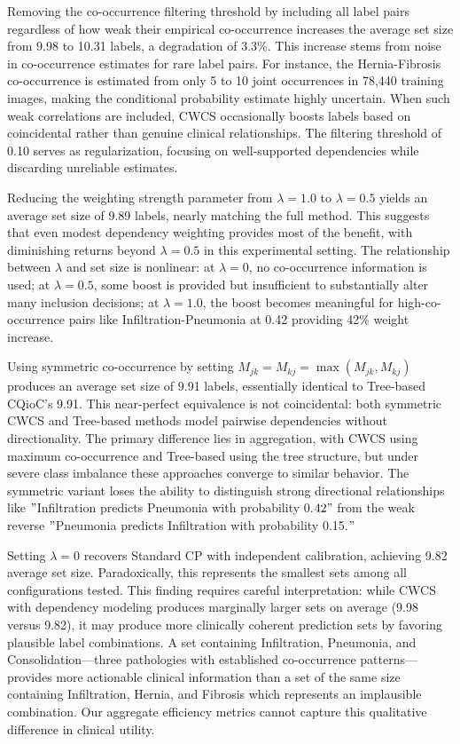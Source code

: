 Removing the co-occurrence filtering threshold by including all label pairs regardless of how weak their empirical co-occurrence increases the average set size from 9.98 to 10.31 labels, a degradation of 3.3\%.
This increase stems from noise in co-occurrence estimates for rare label pairs.
For instance, the Hernia-Fibrosis co-occurrence is estimated from only 5 to 10 joint occurrences in 78,440 training images, making the conditional probability estimate highly uncertain.
When such weak correlations are included, CWCS occasionally boosts labels based on coincidental rather than genuine clinical relationships.
The filtering threshold of 0.10 serves as regularization, focusing on well-supported dependencies while discarding unreliable estimates.

Reducing the weighting strength parameter from $\lambda=1.0$ to $\lambda=0.5$ yields an average set size of 9.89 labels, nearly matching the full method.
This suggests that even modest dependency weighting provides most of the benefit, with diminishing returns beyond $\lambda=0.5$ in this experimental setting.
The relationship between $\lambda$ and set size is nonlinear: at $\lambda=0$, no co-occurrence information is used; at $\lambda=0.5$, some boost is provided but insufficient to substantially alter many inclusion decisions; at $\lambda=1.0$, the boost becomes meaningful for high-co-occurrence pairs like Infiltration-Pneumonia at 0.42 providing 42\% weight increase.

Using symmetric co-occurrence by setting $M_{jk} = M_{kj} = \max(M_{jk}, M_{kj})$ produces an average set size of 9.91 labels, essentially identical to Tree-based CQioC's 9.91.
This near-perfect equivalence is not coincidental: both symmetric CWCS and Tree-based methods model pairwise dependencies without directionality.
The primary difference lies in aggregation, with CWCS using maximum co-occurrence and Tree-based using the tree structure, but under severe class imbalance these approaches converge to similar behavior.
The symmetric variant loses the ability to distinguish strong directional relationships like \("\)Infiltration predicts Pneumonia with probability 0.\(42"\) from the weak reverse \("\)Pneumonia predicts Infiltration with probability 0.15.\("\)

Setting $\lambda=0$ recovers Standard CP with independent calibration, achieving 9.82 average set size.
Paradoxically, this represents the smallest sets among all configurations tested.
This finding requires careful interpretation: while CWCS with dependency modeling produces marginally larger sets on average (9.98 versus 9.82), it may produce more clinically coherent prediction sets by favoring plausible label combinations.
A set containing Infiltration, Pneumonia, and Consolidation—three pathologies with established co-occurrence patterns—provides more actionable clinical information than a set of the same size containing Infiltration, Hernia, and Fibrosis which represents an implausible combination.
Our aggregate efficiency metrics cannot capture this qualitative difference in clinical utility.
